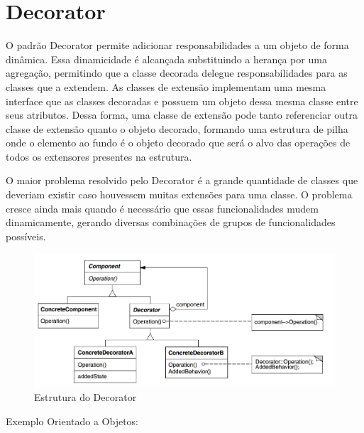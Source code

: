 \section{Decorator}

O padrão Decorator permite adicionar responsabilidades a um 
objeto de forma dinâmica. Essa dinamicidade é alcançada 
substituindo a herança por uma agregação, permitindo que a 
classe decorada delegue responsabilidades para as classes que 
a extendem. As classes de extensão implementam uma mesma 
interface que as classes decoradas e possuem um objeto dessa 
mesma classe entre seus atributos. Dessa forma, uma classe 
de extensão pode tanto referenciar outra classe de extensão 
quanto o objeto decorado, formando uma estrutura de pilha 
onde o elemento ao fundo é o objeto decorado que será o 
alvo das operações de todos os extensores presentes na 
estrutura.

O maior problema resolvido pelo Decorator é a grande 
quantidade de classes que deveriam existir caso houvessem 
muitas extensões para uma classe. O problema cresce ainda 
mais quando é necessário que essas funcionalidades mudem 
dinamicamente, gerando diversas combinações de grupos de 
funcionalidades possíveis.

\begin{figure}[htb]
	\caption{\label{fig_grafico}Estrutura do Decorator}
	\begin{center}
	    \includegraphics[scale=0.5]{5_padroes-contexto-funcional/5.2_estruturais/5.2.4_decorator/diagram.png}
	\end{center}
\end{figure}

Exemplo Orientado a Objetos:

\begin{lstlisting}[caption={Decorator Orientado a Objetos},label=oodecorator]



\end{lstlisting}

